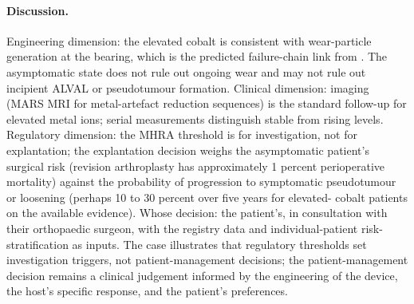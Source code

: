 \paragraph{Discussion.}
Engineering dimension: the elevated cobalt is consistent with
wear-particle generation at the bearing, which is the predicted
failure-chain link from \cite{paper:v6c12-langton-asr-2011,
paper:v6c12-cohen-mom-bmj-2012}. The asymptomatic state does not
rule out ongoing wear and may not rule out incipient ALVAL or
pseudotumour formation. Clinical dimension: imaging (MARS MRI for
metal-artefact reduction sequences) is the standard follow-up for
elevated metal ions; serial measurements distinguish stable from
rising levels. Regulatory dimension: the MHRA threshold is for
investigation, not for explantation; the explantation decision
weighs the asymptomatic patient's surgical risk (revision arthroplasty
has approximately 1 percent perioperative mortality) against the
probability of progression to symptomatic pseudotumour or
loosening (perhaps 10 to 30 percent over five years for elevated-
cobalt patients on the available evidence). Whose decision: the
patient's, in consultation with their orthopaedic surgeon, with
the registry data and individual-patient risk-stratification as
inputs. The case illustrates that regulatory thresholds set
investigation triggers, not patient-management decisions; the
patient-management decision remains a clinical judgement informed
by the engineering of the device, the host's specific response,
and the patient's preferences.
